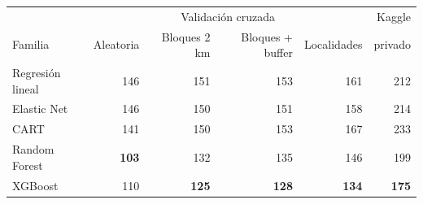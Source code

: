 \begin{tabular}{lrrrr|r}
\toprule
 & \multicolumn{4}{c|}{Validación cruzada} & Kaggle \\
Familia & Aleatoria & Bloques 2 km & Bloques + buffer & Localidades & privado \\
\midrule
Regresión lineal & 146 & 151 & 153 & 161 & 212 \\
Elastic Net & 146 & 150 & 151 & 158 & 214 \\
CART & 141 & 150 & 153 & 167 & 233 \\
Random Forest & \textbf{103} & 132 & 135 & 146 & 199 \\
XGBoost & 110 & \textbf{125} & \textbf{128} & \textbf{134} & \textbf{175} \\
\bottomrule
\end{tabular}
